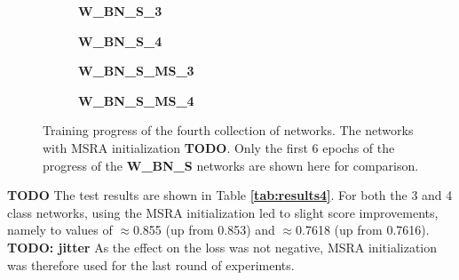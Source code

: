 \begin {figure}[!htb]
	\begin {subfigure}[b]{0.4\linewidth}
		\scalebox{0.65}{}
		\caption{\textbf{W\_BN\_S\_3}}
	\end {subfigure}\hspace{1.75cm}
	\begin {subfigure}[b]{0.4\linewidth}
		\scalebox{0.65}{}
		\caption{\textbf{W\_BN\_S\_4}}
	\end {subfigure}

	\begin {subfigure}[b]{0.4\linewidth}
		\scalebox{0.65}{}
		\caption{\textbf{W\_BN\_S\_MS\_3}}
	\end {subfigure}\hspace{1.75cm}
	\begin {subfigure}[b]{0.4\linewidth}
		\scalebox{0.65}{}
		\caption{\textbf{W\_BN\_S\_MS\_4}}
	\end {subfigure}

		\caption[Training progress of the fourth collection of networks.]{Training progress of the fourth collection of networks. The networks with MSRA initialization \textbf{TODO}. Only the first 6 epochs of the progress of the \textbf{W\_BN\_S} networks are shown here for comparison.}
		\label{fig:weighted_batchnorm_shuffle_msra_training}
\end {figure}


\textbf{TODO} The test results are shown in Table \textbf{\ref{tab:results4}}. For both the 3 and 4 class networks, using the MSRA initialization led to slight score improvements, namely to values of $\approx$0.855 (up from 0.853) and $\approx$0.7618 (up from 0.7616). \textbf{TODO: jitter} As the effect on the loss was not negative, MSRA initialization was therefore used for the last round of experiments.\\



